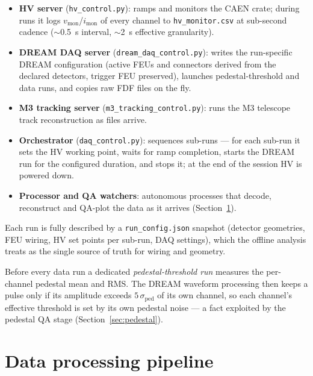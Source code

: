 \documentclass[11pt,a4paper]{article}
\newcommand{\code}[1]{\texttt{#1}}
\begin{document}
\begin{itemize}[itemsep=2pt]
  \item \textbf{HV server} (\code{hv\_control.py}): ramps and monitors the
        CAEN crate; during runs it logs $v_\text{mon}$/$i_\text{mon}$ of every
        channel to \code{hv\_monitor.csv} at sub-second cadence
        ($\sim$\SI{0.5}{s} interval, $\sim$\SI{2}{s} effective granularity).
  \item \textbf{DREAM DAQ server} (\code{dream\_daq\_control.py}): writes the
        run-specific DREAM configuration (active FEUs and connectors derived
        from the declared detectors, trigger FEU preserved), launches
        pedestal-threshold and data runs, and copies raw FDF files on the fly.
  \item \textbf{M3 tracking server} (\code{m3\_tracking\_control.py}): runs
        the M3 telescope track reconstruction as files arrive.
  \item \textbf{Orchestrator} (\code{daq\_control.py}): sequences sub-runs ---
        for each sub-run it sets the HV working point, waits for ramp
        completion, starts the DREAM run for the configured duration, and
        stops it; at the end of the session HV is powered down.
  \item \textbf{Processor and QA watchers}: autonomous processes that decode,
        reconstruct and QA-plot the data as it arrives
        (Section~\ref{sec:pipeline}).
\end{itemize}

Each run is fully described by a \code{run\_config.json} snapshot (detector
geometries, FEU wiring, HV set points per sub-run, DAQ settings), which the
offline analysis treats as the single source of truth for wiring and
geometry.

Before every data run a dedicated \emph{pedestal-threshold run} measures the
per-channel pedestal mean and RMS. The DREAM waveform processing then keeps a
pulse only if its amplitude exceeds $5\,\sigma_\text{ped}$ of its own channel,
so each channel's effective threshold is set by its own pedestal noise --- a
fact exploited by the pedestal QA stage (Section~\ref{sec:pedestal}).

\section{Data processing pipeline}
\label{sec:pipeline}
\end{document}
